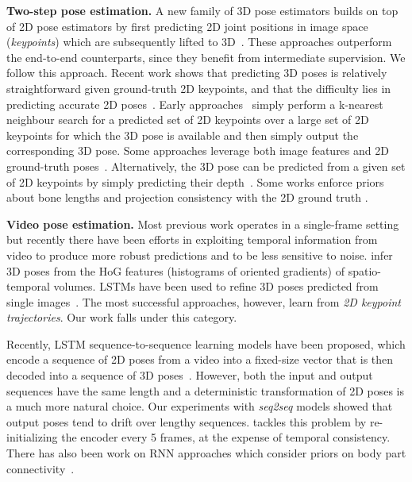 \documentclass[10pt,twocolumn,letterpaper]{article}
\begin{document}
\noindent\textbf{Two-step pose estimation.}
A new family of 3D pose estimators builds on top of 2D pose estimators by first predicting 2D joint positions in image space (\emph{keypoints}) which are subsequently lifted to 3D~\cite{jiang:3d:2010, martinez:simple:2017, pavlakos:coarse:2017, tekin:learning:2017, chen:3d:2017, hossain:exploiting:2018}.
These approaches outperform the end-to-end counterparts, since they benefit from intermediate supervision.
We follow this approach.
Recent work shows that predicting 3D poses is relatively straightforward given ground-truth 2D keypoints, and that the difficulty lies in predicting accurate 2D poses~\cite{martinez:simple:2017}.
Early approaches~\cite{jiang:3d:2010, chen:3d:2017} simply perform a k-nearest neighbour search for a predicted set of 2D keypoints over a large set of 2D keypoints for which the 3D pose is available and then simply output the corresponding 3D pose.
Some approaches leverage both image features and 2D ground-truth poses~\cite{park:3d:2016, pavlakos:coarse:2017, tekin:learning:2017}.
Alternatively, the 3D pose can be predicted from a given set of 2D keypoints by simply predicting their depth~\cite{zhou:towards:2017}. Some works enforce priors about bone lengths and projection consistency with the 2D ground truth \cite{brau:3d:2016}.

\noindent\textbf{Video pose estimation.}
Most previous work operates in a single-frame setting but recently there have been efforts in exploiting temporal information from video to produce more robust predictions and to be less sensitive to noise. 
\cite{tekin:direct:2016} infer 3D poses from the HoG features (histograms of oriented gradients) of spatio-temporal volumes. 
LSTMs have been used to refine 3D poses predicted from single images~\cite{lin:recurrent:2017, katircioglu:learning:2018}.
The most successful approaches, however, learn from \emph{2D keypoint trajectories}. 
Our work falls under this category.

Recently, LSTM sequence-to-sequence learning models have been proposed, which encode a sequence of 2D poses from a video into a fixed-size vector that is then decoded into a sequence of 3D poses~\cite{hossain:exploiting:2018}.
However, both the input and output sequences have the same length and a deterministic transformation of 2D poses is a much more natural choice.
Our experiments with \emph{seq2seq} models showed that output poses tend to drift over lengthy sequences. 
\cite{hossain:exploiting:2018} tackles this problem by re-initializing the encoder every 5 frames, at the expense of temporal consistency. 
There has also been work on RNN approaches which consider priors on body part connectivity~\cite{lee:propagating:2018}.
\end{document}

